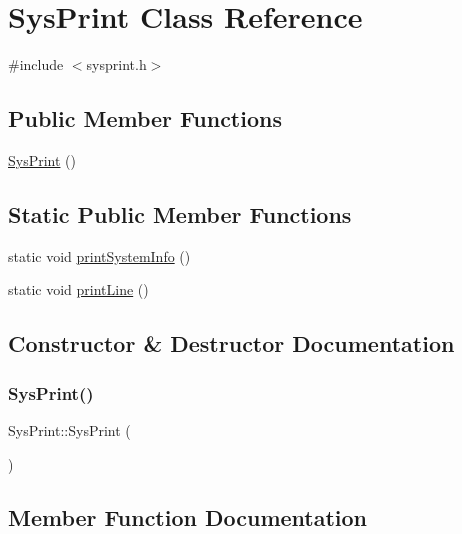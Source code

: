 \hypertarget{class_sys_print}{}\section{Sys\+Print Class Reference}
\label{class_sys_print}


{\ttfamily \#include $<$sysprint.\+h$>$}

\subsection*{Public Member Functions}
\begin{DoxyCompactItemize}
\item 
\mbox{\hyperlink{class_sys_print_a205d71843ed2243d76300df6b854bed8}{Sys\+Print}} ()
\end{DoxyCompactItemize}
\subsection*{Static Public Member Functions}
\begin{DoxyCompactItemize}
\item 
static void \mbox{\hyperlink{class_sys_print_a4572572643f6f4685081a3ae419e5ca9}{print\+System\+Info}} ()
\item 
static void \mbox{\hyperlink{class_sys_print_abdf8282e73cc002e5e572c6f09266cc9}{print\+Line}} ()
\end{DoxyCompactItemize}


\subsection{Constructor \& Destructor Documentation}
\mbox{\label{class_sys_print_a205d71843ed2243d76300df6b854bed8}} 
\subsubsection{\texorpdfstring{SysPrint()}{SysPrint()}}
{\footnotesize\ttfamily Sys\+Print\+::\+Sys\+Print (\begin{DoxyParamCaption}{ }\end{DoxyParamCaption})}



\subsection{Member Function Documentation}
\mbox{\label{class_sys_print_abdf8282e73cc002e5e572c6f09266cc9}} 

